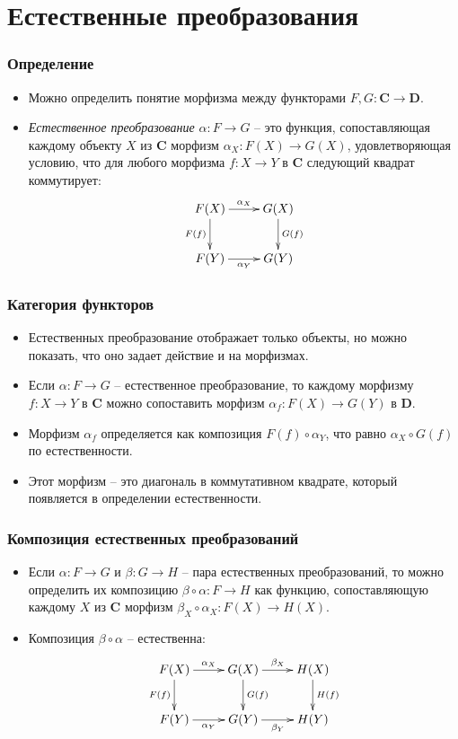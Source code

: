 \documentclass{beamer}
\theoremstyle{definition}
\newcommand{\cat}[1]{\mathbf{#1}}
\renewcommand{\C}{\cat{C}}
\newcommand{\D}{\cat{D}}
\begin{document}
\section{Естественные преобразования}

\begin{frame}
\frametitle{Определение}
\begin{itemize}
\item Можно определить понятие морфизма между функторами $F, G : \C \to \D$.
\item \emph{Естественное преобразование} $\alpha : F \to G$ -- это функция, сопоставляющая каждому объекту $X$ из $\C$ морфизм $\alpha_X : F(X) \to G(X)$, удовлетворяющая условию, что для любого морфизма $f : X \to Y$ в $\C$ следующий квадрат коммутирует:
\[ \xymatrix{ F(X) \ar[r]^{\alpha_X} \ar[d]_{F(f)} & G(X) \ar[d]^{G(f)} \\
              F(Y) \ar[r]_{\alpha_Y}               & G(Y)
            } \]
\end{itemize}
\end{frame}

\begin{frame}
\frametitle{Категория функторов}
\begin{itemize}
\item Естественных преобразование отображает только объекты, но можно показать, что оно задает действие и на морфизмах.
\item Если $\alpha : F \to G$ -- естественное преобразование, то каждому морфизму $f : X \to Y$ в $\C$ можно сопоставить морфизм $\alpha_f : F(X) \to G(Y)$ в $\D$.
\item Морфизм $\alpha_f$ определяется как композиция $F(f) \circ \alpha_Y$, что равно $\alpha_X \circ G(f)$ по естественности.
\item Этот морфизм -- это диагональ в коммутативном квадрате, который появляется в определении естественности.
\end{itemize}
\end{frame}

\begin{frame}
\frametitle{Композиция естественных преобразований}
\begin{itemize}
\item Если $\alpha : F \to G$ и $\beta : G \to H$ -- пара естественных преобразований, то можно определить их композицию $\beta \circ \alpha : F \to H$ как функцию, сопоставляющую каждому $X$ из $\C$ морфизм $\beta_X \circ \alpha_X : F(X) \to H(X)$.
\item Композиция $\beta \circ \alpha$ -- естественна:
\[ \xymatrix{ F(X) \ar[r]^{\alpha_X} \ar[d]_{F(f)} & G(X) \ar[d]^{G(f)} \ar[r]^{\beta_X} & H(X) \ar[d]^{H(f)} \\
              F(Y) \ar[r]_{\alpha_Y}               & G(Y) \ar[r]_{\beta_Y}               & H(Y)
            } \]
\end{itemize}
\end{frame}
\end{document}
